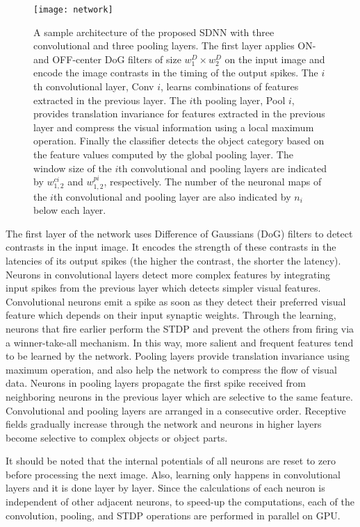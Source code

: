 \documentclass[preprint,5p,12pt,twocolumn]{article}
\begin{document}
\begin{figure*}[!h]
\centering
\texttt{[image: network]}
\caption{ A sample architecture of the proposed SDNN with three convolutional and three pooling layers. The first layer applies ON- and OFF-center DoG filters of size $w_{1}^{D} \times w_{2}^{D}$  on the input image and encode the image contrasts in the timing of the output spikes. The $i$th convolutional layer, Conv $i$, learns combinations of features extracted in the previous layer. The $i$th pooling layer, Pool $i$, provides translation invariance for features extracted in the previous layer and compress the visual information using a local maximum operation. Finally the classifier detects the object category based on the feature values computed by the global pooling layer. The window size of the $i$th convolutional and pooling layers are indicated by $w_{1,2}^{ci}$ and $w_{1,2}^{pi}$, respectively. The number of the neuronal maps of the $i$th convolutional and pooling layer are also indicated by $n_{i}$ below each layer.}
\label{fig-network}
\end{figure*}

The first layer of the network uses Difference of Gaussians (DoG) filters to detect contrasts in the input image. It encodes the strength of these contrasts in the latencies of its output spikes (the higher the contrast, the shorter the latency). Neurons in convolutional layers detect more complex features by integrating input spikes from the previous layer which detects simpler visual features. Convolutional neurons emit a spike as soon as they detect their preferred visual feature which depends on their input synaptic weights. Through the learning, neurons that fire earlier perform the STDP and prevent the others from firing via a winner-take-all mechanism. In this way, more salient and frequent features tend to be learned by the network.  Pooling layers provide translation invariance using maximum operation, and also help the network to compress the flow of visual data. Neurons in pooling layers propagate the first spike received from neighboring neurons in the previous layer which are selective to the same feature. Convolutional and pooling layers are arranged in a consecutive order. Receptive fields gradually increase through the network and neurons in higher layers become selective to complex objects or object parts. 

It should be noted that the internal potentials of all neurons are reset to zero before processing the next image. Also, learning only happens in convolutional layers and it is done layer by layer. Since the calculations of each neuron is independent of other adjacent neurons, to speed-up the computations, each of the convolution, pooling, and STDP operations are performed in parallel on GPU. 
\end{document}
